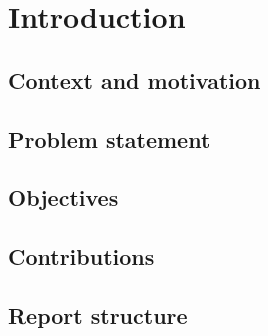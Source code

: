 \chapter*{Introduction}

\section*{Context and motivation}

\section*{Problem statement}

\section*{Objectives}

\section*{Contributions}

\section*{Report structure}
